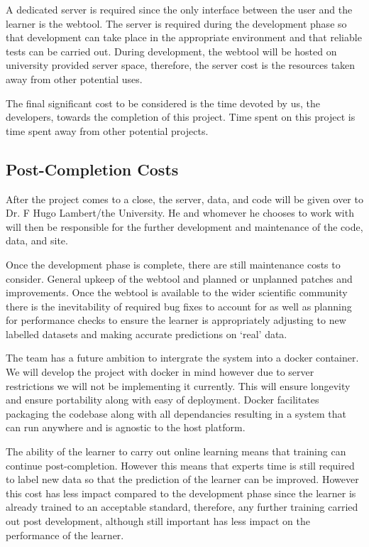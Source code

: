 \documentclass{ecmm427_assignment}
\begin{document}
 A dedicated server is required since the only interface between the user and the learner is the webtool. The server is required during the development phase so that development can take place in the appropriate environment and that reliable tests can be carried out. During development, the webtool will be hosted on university provided server space, therefore, the server cost is the resources taken away from other potential uses.

 The final significant cost to be considered is the time devoted by us, the developers, towards the completion of this project. Time spent on this project is time spent away from other potential projects.

\subsection{Post-Completion Costs}

 After the project comes to a close, the server, data, and code will be given over to Dr. F Hugo Lambert/the University. He and whomever he chooses to work with will then be responsible for the further development and maintenance of the code, data, and site.

 Once the development phase is complete, there are still maintenance costs to consider. General upkeep of the webtool and planned or unplanned patches and improvements. Once the webtool is available to the wider scientific community there is the inevitability of required bug fixes to account for as well as planning for performance checks to ensure the learner is appropriately adjusting to new labelled datasets and making accurate predictions on ‘real’ data.

 The team has a future ambition to intergrate the system into a docker container. We will develop the project with docker in mind however due to server restrictions we will not be implementing it currently. This will ensure longevity and ensure portability along with easy of deployment. Docker facilitates packaging the codebase along with all dependancies resulting in a system that can run anywhere and is agnostic to the host platform.

 The ability of the learner to carry out online learning means that training can continue post-completion. However this means that experts time is still required to label new data so that the prediction of the learner can be improved. However this cost has less impact compared to the development phase since the learner is already trained to an acceptable standard, therefore, any further training carried out post development, although still important has less impact on the performance of the learner.
\end{document}
